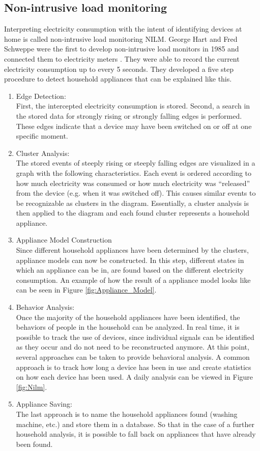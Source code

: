 \subsection{Non-intrusive load monitoring} 
\label{subsec:NILM_sec}
Interpreting electricity consumption with the intent of identifying devices at home is called non-intrusive load monitoring \gls{NILM}. George Hart and Fred Schweppe were the first to develop non-intrusive load monitors in 1985 and connected them to electricity meters \cite{hart1989residential}. They were able to record the current electricity consumption up to every 5 seconds. They developed a five step procedure to detect household appliances that can be explained like this.
\begin{enumerate}
\item Edge Detection:\\
First, the intercepted electricity consumption is stored. Second, a search in the stored data for strongly rising or strongly falling edges is performed. These edges indicate that a device may have been switched on or off at one specific moment.
\item Cluster Analysis:\\ 
The stored events of steeply rising or steeply falling edges are visualized in a graph with the following characteristics. Each event is ordered according to how much electricity was consumed or how much electricity was 	``released'' from the device (e.g. when it was switched off). This causes similar events to be recognizable as clusters in the diagram.
Essentially, a cluster analysis is then applied to the diagram and each found cluster represents a household appliance.
\item Appliance Model Construction\\
Since different household appliances have been determined by the clusters, appliance models can now be constructed. In this step, different states in which an appliance can be in, are found based on the different electricity consumption. An example of how the result of a appliance model looks like can be seen in Figure \ref{fig:Appliance_Model}.
\item Behavior Analysis:\\
Once the majority of the household appliances have been identified, the behaviors of people in the household can be analyzed. In real time, it is possible to track the use of devices, since individual signals can be identified as they occur and do not need to be reconstructed anymore.
At this point, several approaches can be taken to provide behavioral analysis. A common approach is to track how long a device has been in use and create statistics on how each device has been used. A daily analysis can be viewed in Figure \ref{fig:Nilm}.
\item Appliance Saving:\\
The last approach is to name the household appliances found (washing machine, etc.) and store them in a database. So that in the case of a further household analysis, it is possible to fall back on appliances that have already been found.
\end{enumerate}
